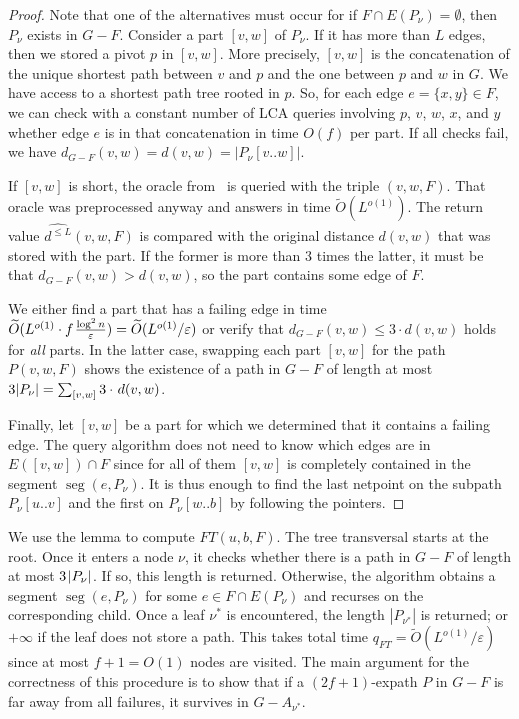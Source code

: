 \documentclass{article}\usepackage[a4paper,margin=20mm]{geometry}
\DeclareMathOperator{\seg}{seg}
\newcommand*{\Otilde}{\widetilde{O}}
\newcommand*{\length}[1]{|#1|}
\newcommand*{\nwspace}{\hspace*{.1em}}
\renewcommand{\le}{\leqslant}
\newcommand{\eps}{\varepsilon}
\begin{document}
\begin{proof}
  Note that one of the alternatives must occur
  for if $F \cap E(P_{\nu}) = \emptyset$, then $P_{\nu}$ exists in $G{-}F$.
%
  Consider a part $[v,w]$ of $P_{\nu}$.
  If it has more than $L$ edges,
  then we stored a pivot $p$ in $[v,w]$.
  More precisely, $[v,w]$ is the concatenation of the unique shortest path between $v$ and $p$
  and the one between $p$ and $w$ in $G$.
  We have access to a shortest path tree rooted in $p$.
  So, for each edge $e = \{x,y\} \in F$,
  we can check with a constant number of LCA queries involving $p$, $v$, $w$, $x$, and $y$
  whether edge $e$ is in that concatenation
  in time $O(f)$ per part.
  If all checks fail, we have $d_{G-F}(v,w) = d(v,w) = \length{P_{\nu}[v..w]}$.

  If $[v,w]$ is short, 
  the oracle from~ is queried with the triple $(v,w,F)$.
  That oracle was preprocessed anyway and answers in time $\Otilde(L^{o(1)})$.
  The return value $\widehat{d^{\le L}}(v,w,F)$ is compared with the original distance $d(v,w)$
  that was stored with the part.
  If the former is more than $3$ times the latter, it must be that $d_{G-F}(v,w) > d(v,w)$,
  so the part contains some edge of $F$.

  We either find a part that has a failing edge in time 
  $\Otilde(L^{o(1)} \cdot f \nwspace \frac{\log^2 n}{\eps})
    = \Otilde(L^{o(1)}/{\eps})$
  or verify that $d_{G-F}(v,w) \le 3 \cdot d(v,w)$ holds for \emph{all} parts.
  In the latter case, swapping each part $[v,w]$ for the path $P(v,w,F)$
  shows the existence of a path in $G{-}F$ of length at most $3 \length{P_{\nu}} =  \sum_{[v,w]} 3 \cdot \nwspace d(v,w)$.

  Finally, let $[v,w]$ be a part for which we determined that it contains a failing edge.
  The query algorithm does not need to know which edges are in $E([v,w]) \cap F$
  since for all of them $[v,w]$ is completely contained in the segment $\seg(e,P_{\nu})$.
  It is thus enough to find the last netpoint on the subpath $P_{\nu}[u..v]$ and 
  the first on $P_{\nu}[w..b]$ by following the pointers.
\end{proof}

We use the lemma to compute $FT(u,b,F)$.
The tree transversal starts at the root.
Once it enters a node $\nu$,
it checks whether there is a path in $G{-}F$
of length at most $3 \nwspace \length{P_{\nu}}$.
If so, this length is returned.
%
Otherwise, the algorithm obtains a segment $\seg(e,P_{\nu})$ for some $e \in F \cap E(P_{\nu})$
and recurses on the corresponding child.
Once a leaf $\nu^*$ is encountered, the length $\length{P_{\nu^*}}$ is returned;
or $+\infty$ if the leaf does not store a path.
This takes total time $q_{FT} = \Otilde(L^{o(1)}/\varepsilon)$
since at most $f{+}1 = O(1)$ nodes are visited.
The main argument for the correctness of this procedure 
is to show that if a $(2f{+}1)$-expath $P$
in $G{-}F$ is far away from all failures,
it survives in $G{-}A_{\nu^*}$.
\end{document}
